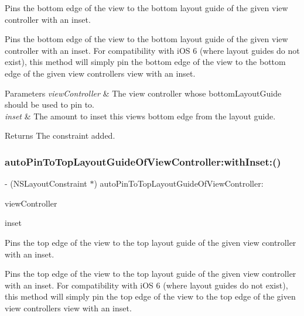 Pins the bottom edge of the view to the bottom layout guide of the given view controller with an inset.

Pins the bottom edge of the view to the bottom layout guide of the given view controller with an inset. For compatibility with i\+OS 6 (where layout guides do not exist), this method will simply pin the bottom edge of the view to the bottom edge of the given view controller\textquotesingle{}s view with an inset.


\begin{DoxyParams}{Parameters}
{\em view\+Controller} & The view controller whose bottom\+Layout\+Guide should be used to pin to. \\
\hline
{\em inset} & The amount to inset this view\textquotesingle{}s bottom edge from the layout guide. \\
\hline
\end{DoxyParams}
\begin{DoxyReturn}{Returns}
The constraint added. 
\end{DoxyReturn}
\mbox{\label{category_u_i_view_07_auto_layout_08_ae8ec00a47cf956cb9a74b86f16802788}} 
\subsubsection{\texorpdfstring{auto\+Pin\+To\+Top\+Layout\+Guide\+Of\+View\+Controller\+:with\+Inset\+:()}{autoPinToTopLayoutGuideOfViewController:withInset:()}}
{\footnotesize\ttfamily -\/ (N\+S\+Layout\+Constraint $\ast$) auto\+Pin\+To\+Top\+Layout\+Guide\+Of\+View\+Controller\+: \begin{DoxyParamCaption}\item[{(U\+I\+View\+Controller $\ast$)}]{view\+Controller }\item[{withInset:(C\+G\+Float)}]{inset }\end{DoxyParamCaption}}

Pins the top edge of the view to the top layout guide of the given view controller with an inset.

Pins the top edge of the view to the top layout guide of the given view controller with an inset. For compatibility with i\+OS 6 (where layout guides do not exist), this method will simply pin the top edge of the view to the top edge of the given view controller\textquotesingle{}s view with an inset.


